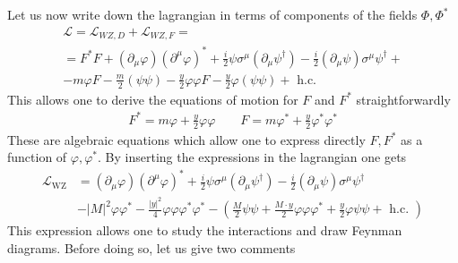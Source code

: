 \documentclass[12pt]{article}
\begin{document}
Let us now write down the lagrangian in terms of components of the fields $\Phi, \Phi^*$
\begin{gather*}
  \mathcal{L} = \mathcal{L}_{WZ, D} + \mathcal{L}_{WZ, F} = \\ 
  = F^{*} F+\left(\partial_{\mu} \varphi\right)\left(\partial^{\mu} \varphi\right)^{*}+\frac{i}{2} \psi \sigma^{\mu}\left(\partial_{\mu} \psi^{\dagger}\right)-\frac{i}{2}\left(\partial_{\mu} \psi\right) \sigma^{\mu} \psi^{\dagger} + \\
      -m \varphi F-\frac{m}{2}(\psi \psi)-\frac{y}{2} \varphi \varphi F-\frac{y}{2} \varphi(\psi \psi)+\text { h.c. }
\end{gather*}
This allows one to derive the equations of motion for $F$ and $F^*$ straightforwardly 
\begin{gather*}
  F^{*} = m \varphi+\frac{y}{2} \varphi \varphi \qquad F = m\varphi^* + \frac{y}{2}\varphi^*\varphi^* 
\end{gather*}
These are algebraic equations which allow one to express directly $F, F^*$ as a function of $\varphi, \varphi^*$. By inserting the expressions in the lagrangian one gets 
\begin{equation}
  \begin{aligned}
      \mathcal{L}_{\mathrm{WZ}} &=\left(\partial_{\mu} \varphi\right)\left(\partial^{\mu} \varphi\right)^{*}+\frac{i}{2} \psi \sigma^{\mu}\left(\partial_{\mu} \psi^{\dagger}\right)-\frac{i}{2}\left(\partial_{\mu} \psi\right) \sigma^{\mu} \psi^{\dagger} \\
      &-|M|^{2} \varphi \varphi^{*}-\frac{|y|^{2}}{4} \varphi \varphi \varphi^{*} \varphi^{*}-\left(\frac{M}{2} \psi \psi+\frac{M \cdot y}{2} \varphi \varphi \varphi^{*}+\frac{y}{2} \varphi \psi \psi+\text { h.c. }\right)
      \end{aligned}
      \label{eq:lagrangian_components}
\end{equation}
This expression allows one to study the interactions and draw Feynman diagrams. Before doing so, let us give two comments 
\end{document}
